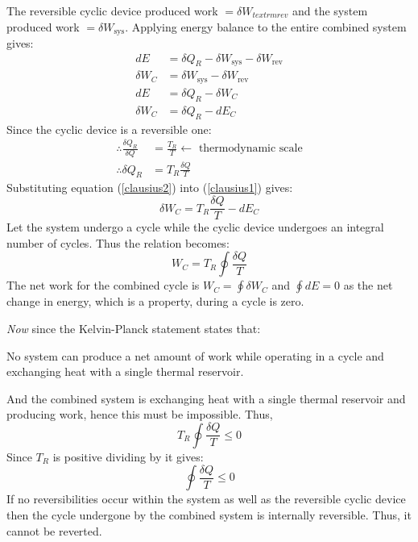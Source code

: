 \documentclass[class=report, crop=false, 12pt,a4paper]{standalone}
\numberwithin{equation}{section}
\begin{document}
The reversible cyclic device produced work \( = \delta W_{textrm{rev}}\) and the system produced work \( =\delta W_{\textrm{sys}} \). Applying energy balance to the entire combined system gives:
\begin{align}
  dE &= \delta Q_R - \delta W_{\textrm{sys}} - \delta W_{\textrm{rev}}\\
  \delta W_C &= \delta W_{\textrm{sys}} - \delta W_{\textrm{rev}}\\
  dE &= \delta Q_R - \delta W_C\\
  \delta W_C &= \delta Q_R - dE_C \label{clausius1}
\end{align}
Since the cyclic device is a reversible one:
\begin{align}
  \therefore \frac{\delta Q_R}{\delta Q} &= \frac{T_R}{T} \leftarrow \textrm{ thermodynamic scale}\\
  \therefore \delta Q_R &= T_R \frac{\delta Q}{T} \label{clausius2}
\end{align}
Substituting equation (\ref{clausius2}) into (\ref{clausius1}) gives:
\begin{equation}
  \delta W_C = T_R \frac{\delta Q}{T} - dE_C
\end{equation}
Let the system undergo a cycle while the cyclic device undergoes an integral number of cycles. Thus the relation becomes:
\begin{equation}
  W_C = T_R \oint \frac{\delta Q}{T}
\end{equation}
The net work for the combined cycle is \( W_C = \oint \delta W_C \) and \(\oint dE=0\) as the net change in energy, which is a property, during a cycle is zero.

\emph{Now} since the Kelvin-Planck statement states that:
\begin{center}
  No system can produce a net amount of work while operating in a cycle and exchanging heat with a single thermal reservoir.
\end{center}
And the combined system is exchanging heat with a single thermal reservoir and producing work, hence this must be impossible. Thus,
\begin{equation}
  T_R \oint \frac{\delta Q}{T} \leq 0
\end{equation}
Since \(T_R\) is positive dividing by it gives:
\begin{equation}
  \oint \frac{\delta Q}{T} \leq 0
\end{equation}
If no reversibilities occur within the system as well as the reversible cyclic device then the cycle undergone by the combined system is internally reversible. Thus, it cannot be reverted.
\end{document}
